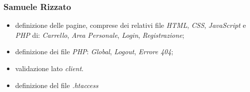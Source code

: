 \documentclass{template}
\begin{document}
	\subsubsection{Samuele Rizzato}
	\begin{itemize}
		\item definizione delle pagine, comprese dei relativi file \textit{HTML}, \textit{CSS}, \textit{JavaScript} e \textit{PHP} di: \textit{Carrello}, \textit{Area Personale}, \textit{Login}, \textit{Registrazione};
		\item definizione dei file \textit{PHP}: \textit{Global}, \textit{Logout}, \textit{Errore 404};
        \item validazione lato \textit{client}.
		\item definizione del file \textit{.htaccess}   
	\end{itemize}
\end{document}
